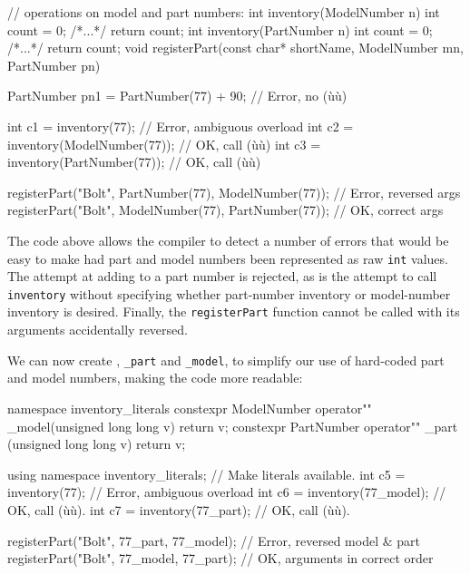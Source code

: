 \begin{emcppslisting}
// operations on model and part numbers:
int inventory(ModelNumber n) { int count = 0; /*...*/ return count; }
int inventory(PartNumber n)  { int count = 0; /*...*/ return count; }
void registerPart(const char* shortName, ModelNumber mn, PartNumber pn) { }

PartNumber pn1 = PartNumber(77) + 90;  // Error, no (ù{}ù)

int c1 = inventory(77);               // Error, ambiguous overload
int c2 = inventory(ModelNumber(77));  // OK, call (ù{}ù)
int c3 = inventory(PartNumber(77));   // OK, call (ù{}ù)

registerPart("Bolt", PartNumber(77), ModelNumber(77)); // Error, reversed args
registerPart("Bolt", ModelNumber(77), PartNumber(77)); // OK, correct args
\end{emcppslisting}
    
\noindent The code above allows the compiler to detect a number of errors that
would be easy to make had part and model numbers been represented as raw
\lstinline!int! values. The attempt at adding to a part number is rejected,
as is the attempt to call \lstinline!inventory! without specifying whether
part-number inventory or model-number inventory is desired. Finally, the
\lstinline!registerPart! function cannot be called with its arguments
accidentally reversed.

We can now create , \lstinline!_part! and
\lstinline!_model!, to simplify our use of hard-coded part and model
numbers, making the code more readable:

\begin{emcppslisting}
namespace inventory_literals
{
    constexpr ModelNumber operator"" _model(unsigned long long v) { return v; }
    constexpr PartNumber  operator"" _part (unsigned long long v) { return v; }
}

using namespace inventory_literals;  // Make literals available.
int c5 = inventory(77);              // Error, ambiguous overload
int c6 = inventory(77_model);        // OK, call (ù{}ù).
int c7 = inventory(77_part);         // OK, call (ù{}ù).

registerPart("Bolt", 77_part, 77_model); // Error, reversed model & part
registerPart("Bolt", 77_model, 77_part); // OK, arguments in correct order
\end{emcppslisting}
    
